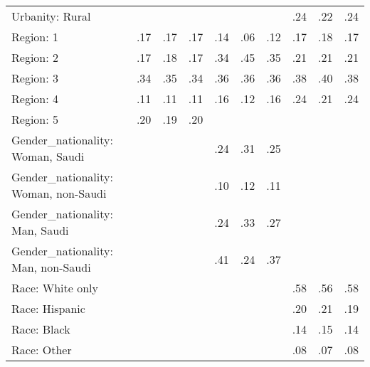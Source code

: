 \begin{tabular}[t]{lccccccccc}
Urbanity: Rural &  &  &  &  &  &  & .24 & .22 & .24\\
\addlinespace
Region: 1 & .17 & .17 & .17 & .14 & .06 & .12 & .17 & .18 & .17\\
Region: 2 & .17 & .18 & .17 & .34 & .45 & .35 & .21 & .21 & .21\\
Region: 3 & .34 & .35 & .34 & .36 & .36 & .36 & .38 & .40 & .38\\
Region: 4 & .11 & .11 & .11 & .16 & .12 & .16 & .24 & .21 & .24\\
Region: 5 & .20 & .19 & .20 &  &  &  &  &  & \\
\addlinespace
Gender\_nationality: Woman, Saudi &  &  &  & .24 & .31 & .25 &  &  & \\
Gender\_nationality: Woman, non-Saudi &  &  &  & .10 & .12 & .11 &  &  & \\
Gender\_nationality: Man, Saudi &  &  &  & .24 & .33 & .27 &  &  & \\
Gender\_nationality: Man, non-Saudi &  &  &  & .41 & .24 & .37 &  &  & \\
\addlinespace
Race: White only &  &  &  &  &  &  & .58 & .56 & .58\\
Race: Hispanic &  &  &  &  &  &  & .20 & .21 & .19\\
Race: Black &  &  &  &  &  &  & .14 & .15 & .14\\
Race: Other &  &  &  &  &  &  & .08 & .07 & .08\\
\bottomrule
\end{tabular}